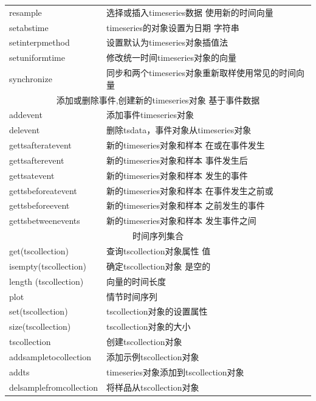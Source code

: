 \begin{longtable}{|l|l|}
            resample  &选择或插入timeseries数据 使用新的时间向量\\
            setabstime & timeseries的对象设置为日期 字符串\\
            setinterpmethod  & 设置默认为timeseries对象插值法\\
            setuniformtime & 修改统一时间timeseries对象的向量\\
            synchronize  & 同步和两个timeseries对象重新取样使用常见的时间向量\\
            \hline
            \multicolumn{2}{|c|}{添加或删除事件,创建新的timeseries对象 基于事件数据}\\
            \hline
            addevent & 添加事件timeseries对象\\
            delevent & 删除tsdata，事件对象从timeseries对象\\
            gettsafteratevent &新的timeseries对象和样本 在或在事件发生\\
            gettsafterevent &新的timeseries对象和样本 事件发生后\\
            gettsatevent & 新的timeseries对象和样本 发生的事件\\
            gettsbeforeatevent & 新的timeseries对象和样本 在事件发生之前或\\
            gettsbeforeevent & 新的timeseries对象和样本 之前发生的事件\\
            gettsbetweenevents & 新的timeseries对象和样本 发生事件之间\\
            \hline
            \multicolumn{2}{|c|}{时间序列集合}\\
            \hline
            get(tscollection)  & 查询tscollection对象属性 值\\
            isempty(tscollection)  & 确定tscollection对象 是空的\\
            length (tscollection)  & 向量的时间长度\\
            plot & 情节时间序列\\
            set(tscollection)  & tscollection对象的设置属性\\
            size(tscollection) & tscollection对象的大小\\
            tscollection & 创建tscollection对象\\
            addsampletocollection  & 添加示例tscollection对象\\
            addts  & timeseries对象添加到tscollection对象\\
            delsamplefromcollection &  将样品从tscollection对象\\

\end{longtable}
